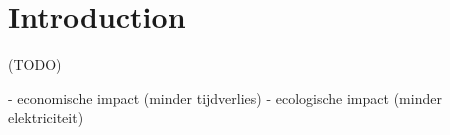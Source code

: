 \chapter{Introduction}

(TODO)

- economische impact (minder tijdverlies)
- ecologische impact (minder elektriciteit)
